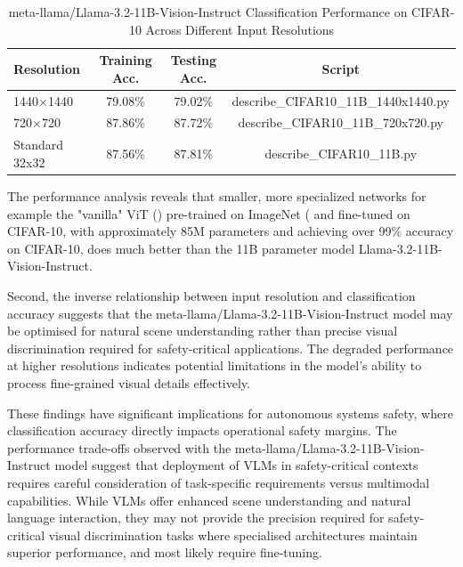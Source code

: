 \begin{table}[ht]
\centering
\begin{tabular}{@{}lccc@{}}
\toprule
Resolution & Training Acc. & Testing Acc. & Script \\
\midrule
1440×1440 & 79.08\% & 79.02\% & describe\_CIFAR10\_11B\_1440x1440.py \\
720×720 & 87.86\% & 87.72\% & describe\_CIFAR10\_11B\_720x720.py \\
Standard 32x32 & 87.56\% & 87.81\% & describe\_CIFAR10\_11B.py \\
\bottomrule
\end{tabular}
\caption{meta-llama/Llama-3.2-11B-Vision-Instruct Classification Performance on CIFAR-10 Across Different Input Resolutions}
\label{tab:vlm_cifar10_results}
\end{table}

The performance analysis reveals that smaller, more specialized networks for example the "vanilla" ViT (\cite{dosovitskiy2021image}) pre-trained on ImageNet (\cite{google2021vitbasepatch16224} and fine-tuned on CIFAR-10, with approximately 85M parameters and achieving over 99\% accuracy on CIFAR-10, does much better than the 11B parameter model Llama-3.2-11B-Vision-Instruct.

Second, the inverse relationship between input resolution and classification accuracy suggests that the meta-llama/Llama-3.2-11B-Vision-Instruct model may be optimised for natural scene understanding rather than precise visual discrimination required for safety-critical applications. The degraded performance at higher resolutions indicates potential limitations in the model's ability to process fine-grained visual details effectively.


These findings have significant implications for autonomous systems safety, where classification accuracy directly impacts operational safety margins. The performance trade-offs observed with the meta-llama/Llama-3.2-11B-Vision-Instruct model suggest that deployment of VLMs in safety-critical contexts requires careful consideration of task-specific requirements versus multimodal capabilities. While VLMs offer enhanced scene understanding and natural language interaction, they may not provide the precision required for safety-critical visual discrimination tasks where specialised architectures maintain superior performance, and most likely require fine-tuning.

